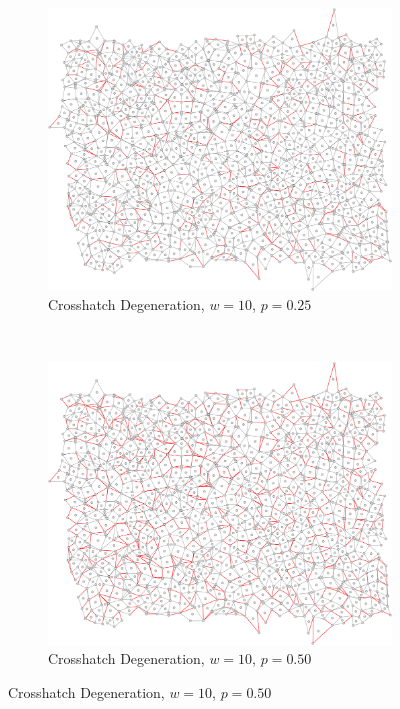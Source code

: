 \documentclass[a4paper,11pt]{article}
\begin{document}
\begin{figure}[htp]
\centering
\begin{subfigure}[t]{0.45\textwidth}
  \includegraphics[width=\textwidth]{ch6_figs/cross_hatch_p25_w10}
  \caption{Crosshatch Degeneration, $w=10$, $p=0.25$}

\end{subfigure}
~
\begin{subfigure}[t]{0.45\textwidth}
  \centering
  \includegraphics[width=\textwidth]{ch6_figs/cross_hatch_p50_w10}
  \caption{Crosshatch Degeneration, $w=10$, $p=0.50$}


\end{subfigure}
\end{figure}
\end{document}
